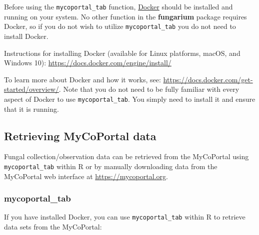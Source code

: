 \documentclass[
]{book}
\begin{document}
Before using the \texttt{mycoportal\_tab} function, \href{https://docs.docker.com/get-started/overview/}{Docker} should be installed and running on your system. No other function in the \textbf{fungarium} package requires Docker, so if you do not wish to utilize \texttt{mycoportal\_tab} you do not need to install Docker.

Instructions for installing Docker (available for Linux platforms, macOS, and Windows 10): \url{https://docs.docker.com/engine/install/}

To learn more about Docker and how it works, see: \url{https://docs.docker.com/get-started/overview/}. Note that you do not need to be fully familiar with every aspect of Docker to use \texttt{mycoportal\_tab}. You simply need to install it and ensure that it is running.

\hypertarget{retrieving-mycoportal-data}{%
\subsection{Retrieving MyCoPortal data}\label{retrieving-mycoportal-data}}

Fungal collection/observation data can be retrieved from the MyCoPortal using \texttt{mycoportal\_tab} within R or by manually downloading data from the MyCoPortal web interface at \url{https://mycoportal.org}.

\hypertarget{mycoportal_tab}{%
\subsubsection{mycoportal\_tab}\label{mycoportal_tab}}

If you have installed Docker, you can use \texttt{mycoportal\_tab} within R to retrieve data sets from the MyCoPortal:
\end{document}
